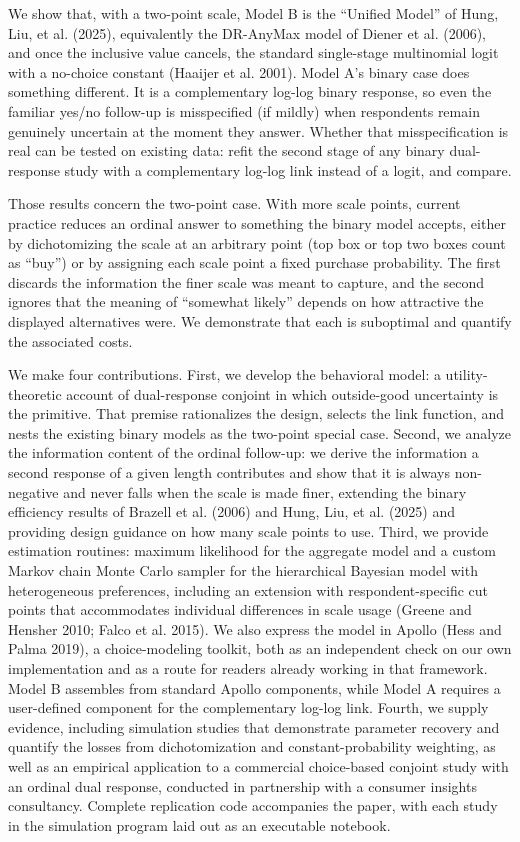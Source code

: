 \documentclass[
  letterpaper,
  DIV=11,
  numbers=noendperiod]{scrartcl}
\theoremstyle{plain}
\theoremstyle{plain}
\theoremstyle{remark}
\begin{document}
We show that, with a two-point scale, Model B is the ``Unified Model''
of Hung, Liu, et al. (2025), equivalently the DR-AnyMax model of Diener
et al. (2006), and once the inclusive value cancels, the standard
single-stage multinomial logit with a no-choice constant (Haaijer et al.
2001). Model A's binary case does something different. It is a
complementary log-log binary response, so even the familiar yes/no
follow-up is misspecified (if mildly) when respondents remain genuinely
uncertain at the moment they answer. Whether that misspecification is
real can be tested on existing data: refit the second stage of any
binary dual-response study with a complementary log-log link instead of
a logit, and compare.

Those results concern the two-point case. With more scale points,
current practice reduces an ordinal answer to something the binary model
accepts, either by dichotomizing the scale at an arbitrary point (top
box or top two boxes count as ``buy'') or by assigning each scale point
a fixed purchase probability. The first discards the information the
finer scale was meant to capture, and the second ignores that the
meaning of ``somewhat likely'' depends on how attractive the displayed
alternatives were. We demonstrate that each is suboptimal and quantify
the associated costs.

We make four contributions. First, we develop the behavioral model: a
utility-theoretic account of dual-response conjoint in which
outside-good uncertainty is the primitive. That premise rationalizes the
design, selects the link function, and nests the existing binary models
as the two-point special case. Second, we analyze the information
content of the ordinal follow-up: we derive the information a second
response of a given length contributes and show that it is always
non-negative and never falls when the scale is made finer, extending the
binary efficiency results of Brazell et al. (2006) and Hung, Liu, et al.
(2025) and providing design guidance on how many scale points to use.
Third, we provide estimation routines: maximum likelihood for the
aggregate model and a custom Markov chain Monte Carlo sampler for the
hierarchical Bayesian model with heterogeneous preferences, including an
extension with respondent-specific cut points that accommodates
individual differences in scale usage (Greene and Hensher 2010; Falco et
al. 2015). We also express the model in Apollo (Hess and Palma 2019), a
choice-modeling toolkit, both as an independent check on our own
implementation and as a route for readers already working in that
framework. Model B assembles from standard Apollo components, while
Model A requires a user-defined component for the complementary log-log
link. Fourth, we supply evidence, including simulation studies that
demonstrate parameter recovery and quantify the losses from
dichotomization and constant-probability weighting, as well as an
empirical application to a commercial choice-based conjoint study with
an ordinal dual response, conducted in partnership with a consumer
insights consultancy. Complete replication code accompanies the paper,
with each study in the simulation program laid out as an executable
notebook.
\end{document}
